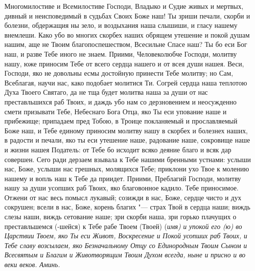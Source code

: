 Многомилостиве и Всемилостиве Господи, Владыко и Судие живых и мертвых, дивный и неисповедимый в судьбах Своих Боже наш! Ты зриши печали, скорби и болезни, обдержащия ны зело, и воздыхания наша слышиши, и гласу нашему внемлеши. Како убо во многих скорбех наших обрящем утешение и покой душам нашим, аще не Твоим благопоспешеством, Всесильне Спасе наш? Ты бо еси Бог наш, и разве Тебе иного не знаем. Приими, Человеколюбче Господи, молитву нашу, юже приносим Тебе от всего сердца нашего и от всея души нашея. Веси, Господи, яко не довольны есмы достойную принести Тебе молитву; но Сам, Всеблагая, научи нас, како подобает молитися Ти. Согрей сердца наша теплотою Духа Твоего Святаго, да не тща будет молитва наша за души от нас преставльшихся раб Твоих, и даждь убо нам со дерзновением и неосужденно смети призывати Тебе, Небеснаго Бога Отца, яко Ты еси упование наше и прибежище; припадаем пред Тобою, в Троице покланяемый и прославляемый Боже наш, и Тебе единому приносим молитву нашу в скорбех и болезнех наших, в радости и печали, яко ты еси утешение наше, радование наше, сокровище наше и жизни нашея Податель: от Тебе бо исходит всяко деяние благо и всяк дар совершен. Сего ради дерзаем взывала к Тебе нашими бренными устнами: услыши нас, Боже, услыши нас грешных, молящихся Тебе; приклони ухо Твое к молению нашему и вопль наш к Тебе да приидет. Приими, Преблагий Господи, молитву нашу за души усопших раб Твоих, яко благовонное кадило. Тебе приносимое. Отжени от нас весь помысл лукавый; созижди в нас, Боже, сердце чисто и дух сокрушен; всели в нас, Боже, корень благих "--- страх Твой в сердца наши; виждь слезы наши, виждь сетование наше; зри скорби наша, зри горько плачущих о преставльшемся (-шейся) к Тебе рабе Твоем (Твоей) (\itshape имя\normalfont{}) и упокой его (ю) во Царствии Твоем, яко Ты еси Живот, Воскресение и Покой усопших раб Твоих, и Тебе славу возсылаем, яко Безначальному Отцу со Единородным Твоим Сыном и Всесвятым и Благим и Животворящим Твоим Духом всегда, ныне и присно и во веки веков. Аминь. 
\mychapterending

 




